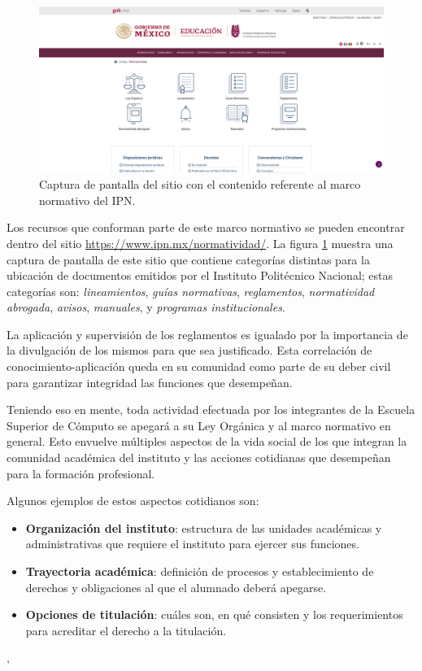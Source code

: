 \begin{figure}
    \centering
    \includegraphics[scale=0.225]{images/1/pagina-normatividad.png}
    \caption{Captura de pantalla del sitio con el contenido referente al marco normativo del IPN.}
    \label{fig:sitio-normatividad}
\end{figure}

Los recursos que conforman parte de este marco normativo se pueden encontrar dentro del sitio \url{https://www.ipn.mx/normatividad/}. La figura \ref{fig:sitio-normatividad} muestra una captura de pantalla de este sitio que contiene categorías distintas para la ubicación de documentos emitidos por el Instituto Politécnico Nacional; estas categorías son: \textit{lineamientos}, \textit{guías normativas}, \textit{reglamentos}, \textit{normatividad abrogada}, \textit{avisos}, \textit{manuales}, y \textit{programas institucionales}.

La aplicación y supervisión de los reglamentos es igualado por la importancia de la divulgación de los mismos para que sea justificado. Esta correlación de conocimiento-aplicación queda en su comunidad como parte de su deber civil para garantizar integridad las funciones que desempeñan.

Teniendo eso en mente, toda actividad efectuada por los integrantes de la Escuela Superior de Cómputo se apegará a su Ley Orgánica y al marco normativo en general. Esto envuelve múltiples aspectos de la vida social de los que integran la comunidad académica del instituto y las acciones cotidianas que desempeñan para la formación profesional.

Algunos ejemplos de estos aspectos cotidianos son:

\begin{itemize}
    \item \textbf{Organización del instituto}: estructura de las unidades académicas y administrativas que requiere el instituto para ejercer sus funciones.
    \item \textbf{Trayectoria académica}: definición de procesos y establecimiento de derechos y obligaciones al que el alumnado deberá apegarse.
    \item \textbf{Opciones de titulación}: cuáles son, en qué consisten y los requerimientos para acreditar el derecho a la titulación.
\end{itemize},

